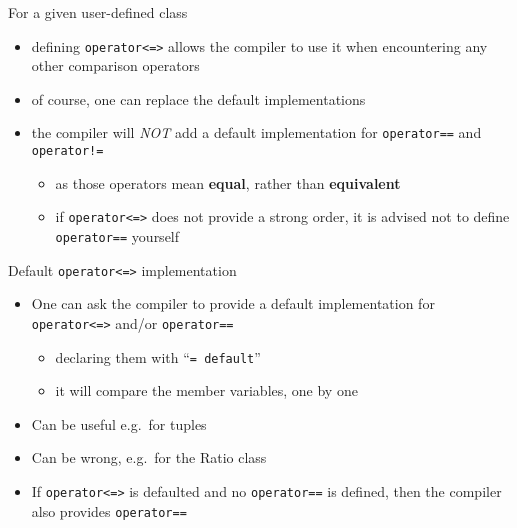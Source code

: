 \begin{frame}[fragile]
  \begin{block}{For a given user-defined class}
    \begin{itemize}
    \item defining \texttt{operator<=>} allows the compiler to use it when encountering any other comparison operators
    \item of course, one can replace the default implementations
    \item the compiler will \emph{NOT} add a default implementation for \texttt{operator==} and \texttt{operator!=}
      \begin{itemize}
      \item as those operators mean \textbf{equal}, rather than \textbf{equivalent}
      \item if \texttt{operator<=>} does not provide a strong order, it is advised not to define \texttt{operator==} yourself
      \end{itemize}
    \end{itemize}
  \end{block}
\end{frame}

\begin{frame}[fragile]
  \begin{block}{Default \texttt{operator<=>} implementation}
    \begin{itemize}
    \item One can ask the compiler to provide a default implementation for \texttt{operator<=>} and/or \texttt{operator==}
      \begin{itemize}
        \item declaring them with ``\texttt{= default}''
        \item it will compare the member variables, one by one
      \end{itemize}
    \item Can be useful e.g.\ for tuples
    \item Can be wrong, e.g.\ for the Ratio class
    \item If \texttt{operator<=>} is defaulted and no \texttt{operator==} is defined, then the compiler also provides \texttt{operator==}
    \end{itemize}
  \end{block}
\end{frame}

